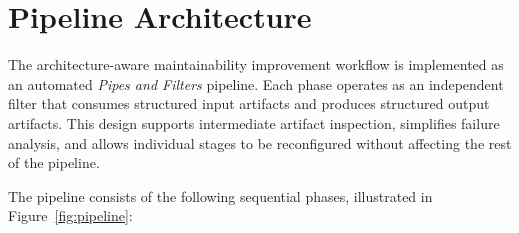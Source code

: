 \section{Pipeline Architecture}
\label{sec:met_pipeline}

The architecture-aware maintainability improvement workflow is implemented as an automated \textit{Pipes and Filters} pipeline. Each phase operates as an independent filter that consumes structured input artifacts and produces structured output artifacts. This design supports intermediate artifact inspection, simplifies failure analysis, and allows individual stages to be reconfigured without affecting the rest of the pipeline.

The pipeline consists of the following sequential phases, illustrated in Figure~\ref{fig:pipeline}:

